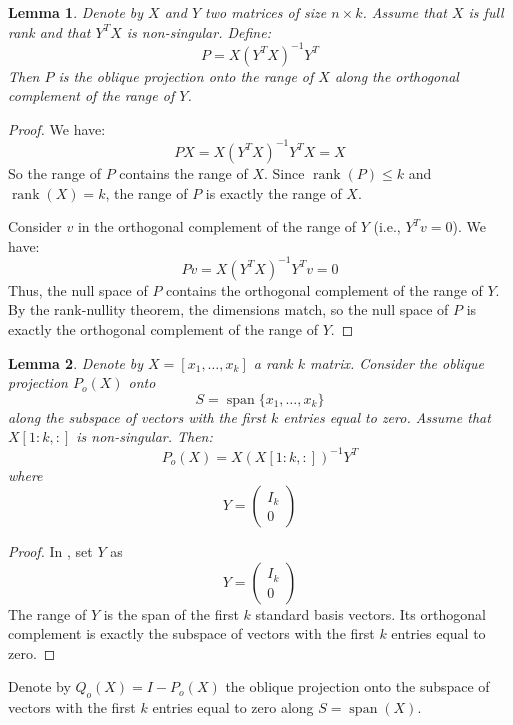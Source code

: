 \documentclass{article}
\DeclareMathOperator{\rk}{rank}
\DeclareMathOperator{\spn}{span}
\newcommand{\by}{\times}
\newtheorem{lemma}{Lemma}[section]
\begin{document}
\begin{lemma}\label{lem:oblique_projection}
    Denote by $X$ and $Y$ two matrices of size $n \by k$. Assume that $X$ is full rank and that $Y^T X$ is non-singular. Define:
    \[ P = X {(Y^T X)}^{-1} Y^T \]
    Then $P$ is the oblique projection onto the range of $X$ along the orthogonal complement of the range of $Y$.
\end{lemma}

\begin{proof}
    We have:
    \[ P X = X {(Y^T X)}^{-1} Y^T X = X \]
    So the range of $P$ contains the range of $X$. Since $\rk(P) \le k$ and $\rk(X)=k$, the range of $P$ is exactly the range of $X$.

    Consider $v$ in the orthogonal complement of the range of $Y$ (i.e., $Y^T v = 0$). We have:
    \[ P v = X {(Y^T X)}^{-1} Y^T v = 0 \]
    Thus, the null space of $P$ contains the orthogonal complement of the range of $Y$. By the rank-nullity theorem, the dimensions match, so the null space of $P$ is exactly the orthogonal complement of the range of $Y$.
\end{proof}

\begin{lemma}\label{lem:oblique_projection_specific}
    Denote by $X = [x_1, \ldots, x_k]$ a rank $k$ matrix. Consider the oblique projection $P_o(X)$ onto
    \[ S = \spn\{ x_1,\dots,x_k \} \] %
    along the subspace of vectors with the first $k$ entries equal to zero. Assume that $X[1:k,:]$ is non-singular. Then:
    \[ P_o(X) = X {(X[1:k,:])}^{-1} Y^T \]
    where
    \[ Y = \begin{pmatrix}
            I_k \\ 0
        \end{pmatrix} \]
\end{lemma}

\begin{proof}
    In , set $Y$ as
    \[ Y = \begin{pmatrix}
            I_k \\ 0
        \end{pmatrix} \]
    The range of $Y$ is the span of the first $k$ standard basis vectors. Its orthogonal complement is exactly the subspace of vectors with the first $k$ entries equal to zero.
\end{proof}

Denote by $Q_o(X) = I - P_o(X)$ the oblique projection onto the subspace of vectors with the first $k$ entries equal to zero along $S=\spn(X)$.
\end{document}
